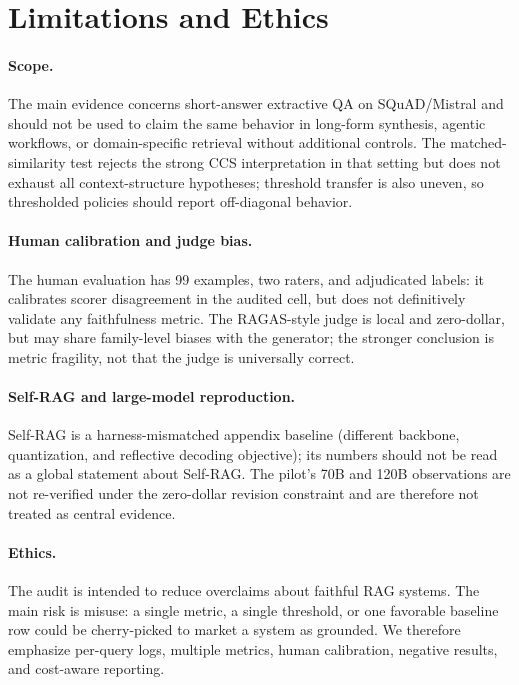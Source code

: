 \section{Limitations and Ethics}
\label{sec:limitations_ethics}

\paragraph{Scope.}
The main evidence concerns short-answer extractive QA on SQuAD/Mistral and
should not be used to claim the same behavior in long-form synthesis, agentic
workflows, or domain-specific retrieval without additional controls. The
matched-similarity test rejects the strong CCS interpretation in that setting
but does not exhaust all context-structure hypotheses; threshold transfer is
also uneven, so thresholded policies should report off-diagonal behavior.

\paragraph{Human calibration and judge bias.}
The human evaluation has 99 examples, two raters, and adjudicated labels: it
calibrates scorer disagreement in the audited cell, but does not definitively
validate any faithfulness metric. The RAGAS-style judge is local and
zero-dollar, but may share family-level biases with the generator; the stronger
conclusion is metric fragility, not that the judge is universally correct.

\paragraph{Self-RAG and large-model reproduction.}
Self-RAG is a harness-mismatched appendix baseline (different backbone,
quantization, and reflective decoding objective); its numbers should not be
read as a global statement about Self-RAG. The pilot's 70B and 120B
observations are not re-verified under the zero-dollar revision constraint and
are therefore not treated as central evidence.

\paragraph{Ethics.}
The audit is intended to reduce overclaims about faithful RAG systems. The
main risk is misuse: a single metric, a single threshold, or one favorable
baseline row could be cherry-picked to market a system as grounded. We
therefore emphasize per-query logs, multiple metrics, human calibration,
negative results, and cost-aware reporting.
